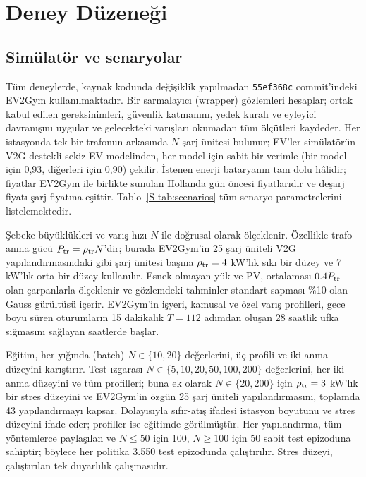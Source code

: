 \section{Deney Düzeneği}\label{sec:setup}

\subsection{Simülatör ve senaryolar}\label{sec:scenarios}

Tüm deneylerde, kaynak kodunda değişiklik yapılmadan \texttt{55ef368c} commit'indeki EV2Gym \cite{orfanoudakis2025ev2gym} kullanılmaktadır.
Bir sarmalayıcı (wrapper) gözlemleri hesaplar; ortak kabul edilen gereksinimleri, güvenlik katmanını, yedek kuralı ve eyleyici davranışını uygular ve gelecekteki varışları okumadan tüm ölçütleri kaydeder.
Her istasyonda tek bir trafonun arkasında $N$ şarj ünitesi bulunur; EV'ler simülatörün V2G destekli sekiz EV modelinden, her model için sabit bir verimle (bir model için 0,93, diğerleri için 0,90) çekilir.
İstenen enerji bataryanın tam dolu hâlidir; fiyatlar EV2Gym ile birlikte sunulan Hollanda gün öncesi fiyatlarıdır ve deşarj fiyatı şarj fiyatına eşittir.
Tablo~\ref{S-tab:scenarios} tüm senaryo parametrelerini listelemektedir.

Şebeke büyüklükleri ve varış hızı $N$ ile doğrusal olarak ölçeklenir.
Özellikle trafo anma gücü $P_{\mathrm{tr}}=\rho_{\mathrm{tr}}N$'dir; burada EV2Gym'in 25 şarj üniteli V2G yapılandırmasındaki gibi şarj ünitesi başına $\rho_{\mathrm{tr}}=4$ kW'lık sıkı bir düzey ve 7 kW'lık orta bir düzey kullanılır.
Esnek olmayan yük ve PV, ortalaması $0.4P_{\mathrm{tr}}$ olan çarpanlarla ölçeklenir ve gözlemdeki tahminler standart sapması \%10 olan Gauss gürültüsü içerir.
EV2Gym'in işyeri, kamusal ve özel varış profilleri, gece boyu süren oturumların 15 dakikalık $T=112$ adımdan oluşan 28 saatlik ufka sığmasını sağlayan saatlerde başlar.

Eğitim, her yığında (batch) $N\in\{10,20\}$ değerlerini, üç profili ve iki anma düzeyini karıştırır.
Test ızgarası $N\in\{5,10,20,50,100,200\}$ değerlerini, her iki anma düzeyini ve tüm profilleri; buna ek olarak $N\in\{20,200\}$ için $\rho_{\mathrm{tr}}=3$ kW'lık bir stres düzeyini ve EV2Gym'in özgün 25 şarj üniteli yapılandırmasını, toplamda 43 yapılandırmayı kapsar.
Dolayısıyla sıfır-atış ifadesi istasyon boyutunu ve stres düzeyini ifade eder; profiller ise eğitimde görülmüştür.
Her yapılandırma, tüm yöntemlerce paylaşılan ve $N\le50$ için 100, $N\ge100$ için 50 sabit test epizoduna sahiptir; böylece her politika 3.550 test epizodunda çalıştırılır.
Stres düzeyi, çalıştırılan tek duyarlılık çalışmasıdır.

